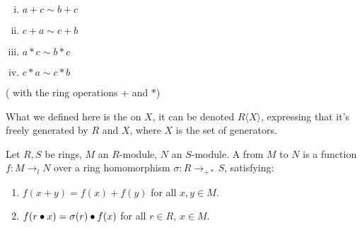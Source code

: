 \begin{definition}
\begin{enumerate}
    \begin{enumerate}[(i)]
    
    \item $a + c \sim b + c$
    \item $c + a \sim c + b$
    \item $a * c \sim b * c$
    \item $c * a \sim c * b$

    \end{enumerate}

    ( with the ring operations $+$ and $*$)

    \end{enumerate}

\end{definition}

\begin{remark}
    \label{mk:FreeAlgebra}

    What we defined here is the  on $X$, it can be denoted $R\langle X \rangle$,
    expressing that it's freely generated by $R$ and $X$, where $X$ is the set of generators.

\end{remark}

\begin{definition}
    \label{LinearMap}
    \leanok

    Let $R, S$ be rings, $M$ an $R$-module, $N$ an $S$-module.
    A  from $M$ to $N$ is a function $f : M \to_{l} N$ over a ring homomorphism $\sigma : R \to_{+*} S$, satisfying:

    \begin{enumerate}

    \item $f(x + y) = f(x) + f(y)$ for all $x, y \in M$.
    \item $f(r \bullet x) = \sigma(r) \bullet f(x)$ for all $r \in R$, $x \in M$.
    
    \end{enumerate}

\end{definition}

